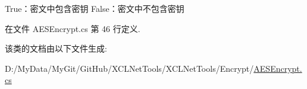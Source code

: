 True：密文中包含密钥 False：密文中不包含密钥 



在文件 A\-E\-S\-Encrypt.\-cs 第 46 行定义.



该类的文档由以下文件生成\-:\begin{DoxyCompactItemize}
\item 
D\-:/\-My\-Data/\-My\-Git/\-Git\-Hub/\-X\-C\-L\-Net\-Tools/\-X\-C\-L\-Net\-Tools/\-Encrypt/\hyperlink{_a_e_s_encrypt_8cs}{A\-E\-S\-Encrypt.\-cs}\end{DoxyCompactItemize}
